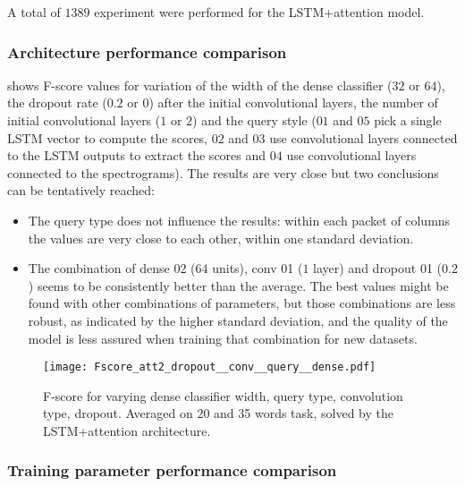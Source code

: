 A total of $1389$ experiment were performed for the LSTM+attention model.

\subsubsection{Architecture performance comparison}

 shows F-score values for 
variation of 
the width of the dense classifier ($32$ or $64$),
the dropout rate ($0.2$ or $0$) after the initial convolutional layers,
the number of initial convolutional layers ($1$ or $2$)
and
the query style ($01$ and $05$ pick a single LSTM vector to compute the scores,
$02$ and $03$ use convolutional layers connected to the LSTM outputs to extract
the scores and $04$  use convolutional layers connected to the spectrograms).
The results are very close but two conclusions can be tentatively reached:

\begin{itemize}
    \item The query type does not influence
the results: within each packet of columns the values are very close to each
other, within one standard deviation.
    \item The combination of dense 02 ($64$ units), conv 01 ($1$ layer) and dropout 01 ($0.2$)
seems to be consistently better than the average.
The best values might be found with other combinations of parameters, but those
combinations are less robust, as indicated by the higher standard deviation,
and the quality of the model is less assured when training that combination for
new datasets.
\end{itemize}

\begin{figure*}[t!]
    \centering
    \texttt{[image: Fscore\_att2\_dropout\_\_conv\_\_query\_\_dense.pdf]}
    \caption{F-score for varying
        dense classifier width,
        query type,
        convolution type,
        dropout.
        Averaged on 20 and 35 words task, solved by the LSTM+attention architecture.
        }%
    \label{fig:att_dropout_conv_query_dense}
\end{figure*}

\subsubsection{Training parameter performance comparison}

